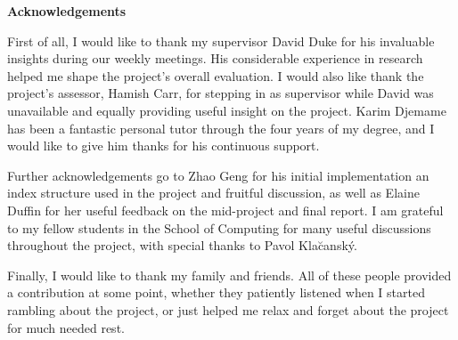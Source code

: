 \begin{center}
    {\LARGE\bf Acknowledgements}
\end{center}

First of all, I would like to thank my supervisor David Duke for his invaluable insights during our weekly meetings. His considerable experience in research helped me shape the project's overall evaluation. I would also like thank the project's assessor, Hamish Carr, for stepping in as supervisor while David was unavailable and equally providing useful insight on the project. Karim Djemame has been a fantastic personal tutor through the four years of my degree, and I would like to give him thanks for his continuous support.

Further acknowledgements go to Zhao Geng for his initial implementation an index structure used in the project and fruitful discussion, as well as Elaine Duffin for her useful feedback on the mid-project and final report. I am grateful to my fellow students in the School of Computing for many useful discussions throughout the project, with special thanks to Pavol Kla\u{c}ansk\'{y}.

Finally, I would like to thank my family and friends. All of these people provided a contribution at some point, whether they patiently listened when I started rambling about the project, or just helped me relax and forget about the project for much needed rest.